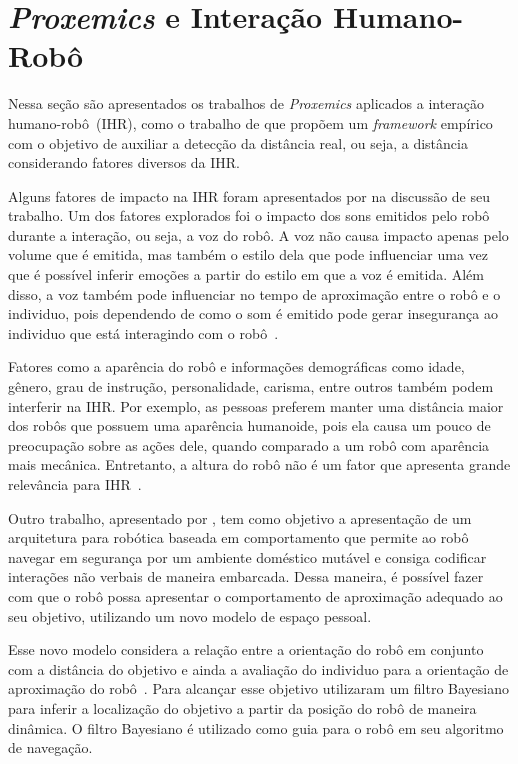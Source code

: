 \section{\emph{Proxemics} e Interação Humano-Robô}
\label{sec:proxemicsihr}

Nessa seção são apresentados os trabalhos de \emph{Proxemics} aplicados a interação humano-robô~(IHR), como o trabalho de  que propõem um \emph{framework} empírico com o objetivo de auxiliar a detecção da distância real, ou seja, a distância considerando fatores diversos da IHR.

Alguns fatores de impacto na IHR foram apresentados por  na discussão de seu trabalho. Um dos fatores explorados foi o impacto dos sons emitidos pelo robô durante a interação, ou seja, a voz do robô. A voz não causa impacto apenas pelo volume que é emitida, mas também o estilo dela que pode influenciar uma vez que é possível inferir emoções a partir do estilo em que a voz é emitida. Além disso, a voz também pode influenciar no tempo de aproximação entre o robô e o individuo, pois dependendo de como o som é emitido pode gerar insegurança ao individuo que está interagindo com o robô~\cite{Walters:2009}.

Fatores como a aparência do robô e informações demográficas como idade, gênero, grau de instrução, personalidade, carisma, entre outros também podem interferir na IHR. Por exemplo, as pessoas preferem manter uma distância maior dos robôs que possuem uma aparência humanoide, pois ela causa um pouco de preocupação sobre as ações dele, quando comparado a um robô com aparência mais mecânica. Entretanto, a altura do robô não é um fator que apresenta grande relevância para IHR~\cite{Walters:2009}.

Outro trabalho, apresentado por , tem como objetivo a apresentação de um arquitetura para robótica baseada em comportamento que permite ao robô navegar em segurança por um ambiente doméstico mutável e consiga codificar interações não verbais de maneira embarcada. Dessa maneira, é possível fazer com que o robô possa apresentar o comportamento de aproximação adequado ao seu objetivo, utilizando um novo modelo de espaço pessoal.

Esse novo modelo considera a relação entre a orientação do robô em conjunto com a distância do objetivo e ainda a avaliação do individuo para a orientação de aproximação do robô~\cite{Torta:2011}. Para alcançar esse objetivo  utilizaram um filtro Bayesiano para inferir a localização do objetivo a partir da posição do robô de maneira dinâmica. O filtro Bayesiano é utilizado como guia para o robô em seu algoritmo de navegação. 

